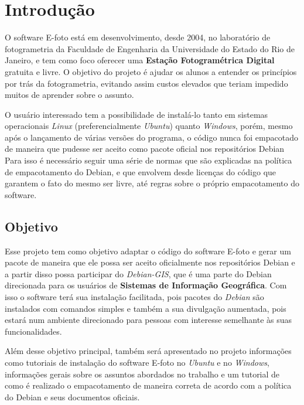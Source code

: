 \chapter*{Introdução}

O software E-foto está em desenvolvimento, desde 2004, no laboratório de fotogrametria da Faculdade de Engenharia da Universidade do Estado do Rio de Janeiro, e tem como foco oferecer uma \textbf{Estação Fotogramétrica Digital} gratuita e livre. O objetivo do projeto é ajudar os alunos a entender os princípios por trás da fotogrametria, evitando assim custos elevados que teriam impedido muitos de aprender sobre o assunto.

O usuário interessado tem a possibilidade de instalá-lo tanto em sistemas operacionais \textit{Linux} (preferencialmente \textit{Ubuntu}) quanto \textit{Windows}, porém, mesmo após o lançamento de várias versões do programa, o código nunca foi empacotado de maneira que pudesse ser aceito como pacote oficial nos repositórios Debian Para isso é necessário seguir uma série de normas que são explicadas na política de empacotamento do Debian, e que envolvem desde licenças do código que garantem o fato do mesmo ser livre, até regras sobre o próprio empacotamento do software.

\section*{Objetivo}

Esse projeto tem como objetivo adaptar o código do software E-foto e gerar um pacote  de maneira que ele possa ser aceito oficialmente nos repositórios Debian e a partir disso possa participar do \textit{Debian-GIS}, que é uma parte do Debian direcionada para os usuários de \textbf{Sistemas de Informação Geográfica}. Com isso o software terá sua instalação facilitada, pois pacotes do \textit{Debian} são instalados com comandos simples e também a sua divulgação aumentada, pois estará num ambiente direcionado para pessoas com interesse semelhante às suas funcionalidades. 

Além desse objetivo principal, também será apresentado no projeto informações como tutoriais de instalação do software E-foto no \textit{Ubuntu} e no \textit{Windows}, informações gerais sobre os assuntos abordados no trabalho e um tutorial de como é realizado o empacotamento de maneira correta de acordo com a política do Debian e seus documentos oficiais.

